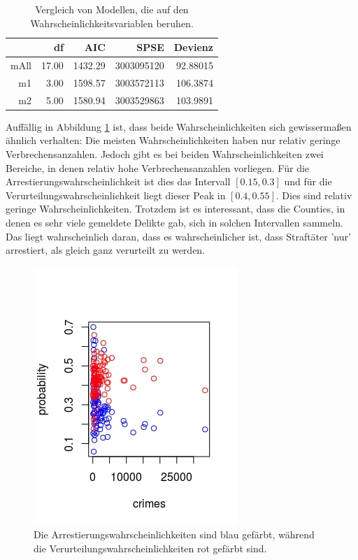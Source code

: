 \begin{table}[ht]
\centering
\begin{tabular}{rrrrr}
  \hline
 & df & AIC & SPSE & Devienz\\ 
  \hline
mAll & 17.00 & 1432.29 & 3003095120 & 92.88015 \\ 
  m1 & 3.00 & 1598.57 & 3003572113 & 106.3874\\ 
  m2 & 5.00 & 1580.94 & 3003529863 & 103.9891\\ 
   \hline
\end{tabular}
\label{tab:sfm}
\caption{Vergleich von Modellen, die auf den Wahrscheinlichkeitsvariablen beruhen.}
\end{table}

Auff\"allig in Abbildung \ref{fig:nbd} ist, dass beide Wahrscheinlichkeiten sich gewisserma\ss{}en \"ahnlich verhalten:
Die meisten Wahrscheinlichkeiten haben nur relativ geringe Verbrechensanzahlen.
Jedoch gibt es bei beiden Wahrscheinlichkeiten zwei Bereiche, in denen relativ hohe Verbrechensanzahlen vorliegen.
F\"ur die Arrestierungswahrscheinlichkeit ist dies das Intervall $[0.15, 0.3]$ und f\"ur die Verurteilungswahrscheinlichkeit liegt dieser Peak in $[0.4, 0.55]$.
Dies sind relativ geringe Wahrscheinlichkeiten.
Trotzdem ist es interessant, dass die Counties, in denen es sehr viele gemeldete Delikte gab, sich in solchen Intervallen sammeln.
Das liegt wahrscheinlich daran, dass es wahrscheinlicher ist, dass Straft\"ater 'nur' arrestiert, als gleich ganz verurteilt zu werden.
 

\begin{figure}
\centering
\includegraphics[scale=0.7]{./jpgs/prvc.jpeg}
\caption{Die Arrestierungswahrscheinlichkeiten sind blau gef\"arbt, w\"ahrend die Verurteilungswahrscheinlichkeiten rot gef\"arbt sind.}
\label{fig:nbd}
\end{figure}


